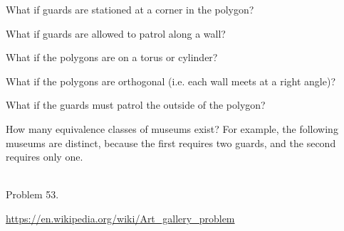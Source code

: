 \documentclass{article}
\begin{document}
\begin{related}
  \item What if guards are stationed at a corner in the polygon?
  \item What if guards are allowed to patrol along a wall?
  \item What if the polygons are on a torus or cylinder?
  \item What if the polygons are orthogonal (i.e. each wall meets at a right angle)?
  \item What if the guards must patrol the outside of the polygon?
  \item How many equivalence classes of museums exist? For example, the
  following museums are distinct, because the first requires two guards, and
  the second requires only one.\\~\\
  \hspace{0.5cm}
\end{related}
\begin{references}
  \item Problem 53.
  \item \url{https://en.wikipedia.org/wiki/Art_gallery_problem}
\end{references}
\end{document}
